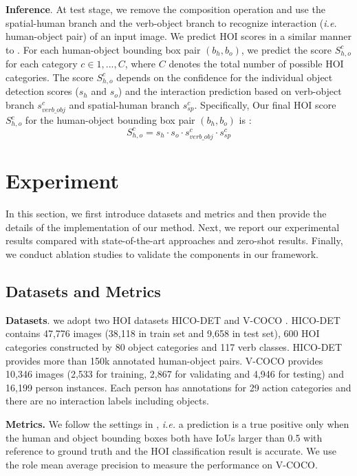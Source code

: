 \documentclass[runningheads]{llncs}
\newcommand{\ie}{\textit{i.e. }}
\begin{document}
\textbf{Inference}. At test stage, we remove the composition operation and use the spatial-human branch and the verb-object branch to recognize interaction (\ie human-object pair) of an input image. We predict HOI scores in a similar manner to \cite{gao2018ican}. For each human-object bounding box pair $(b_h, b_o)$, we predict the score $S^c_{h,o}$ for each category $c \in {1, ..., C}$, where $C$ denotes the total number of possible HOI categories. The score $S^c_{h,o}$ depends on the confidence for the individual object detection scores ($s_h$ and $s_o$) and the interaction prediction based on verb-object branch $s^c_{verb\_obj}$ and spatial-human branch $s^c_{sp}$. Specifically, Our final HOI score $S^c_{h,o}$ for the human-object bounding box pair $(b_h, b_o)$ is :
\begin{equation}
\label{eq:fuse_scores}
S^c_{h,o} = s_h \cdot s_o \cdot s^c_{verb\_obj} \cdot s^c_{sp}
\end{equation}

\section{Experiment}
In this section, we first introduce datasets and metrics and then provide the details of the implementation of our method. Next, we report our experimental results compared with state-of-the-art approaches and zero-shot results. Finally, we conduct ablation studies to validate the components in our framework.

\subsection{Datasets and Metrics}
{\bf Datasets}. we adopt two HOI datasets HICO-DET \cite{chao2018learning} and V-COCO \cite{gupta2015visual}.
 HICO-DET \cite{chao2018learning} contains 47,776 images (38,118 in train set and 9,658 in test set),
600 HOI categories constructed by 80 object categories and 117 verb classes. HICO-DET provides more than 150k
 annotated human-object pairs. V-COCO \cite{gupta2015visual} provides 10,346 images (2,533 for
training, 2,867 for validating and 4,946 for testing) and 16,199 person instances.
Each person has annotations for 29 action categories and there are no interaction labels including objects.

{\bf Metrics.} We follow the settings in \cite{gao2018ican}, \ie a prediction is a true positive
only when the human and object bounding boxes both have IoUs larger than 0.5 with reference to ground
truth and the HOI classification result is accurate. We use the role mean average precision to
measure the performance on V-COCO.
\end{document}
